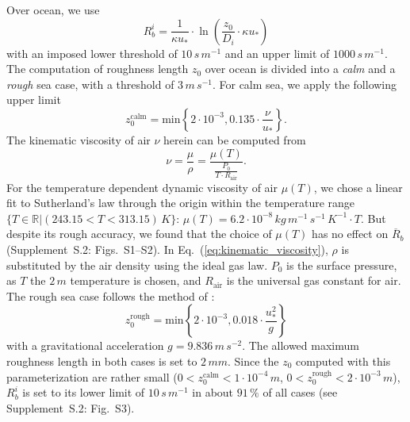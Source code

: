 \documentclass[gmd, manuscript]{copernicus}
\providecommand{\DIFadd}[1]{{\protect\color{blue}\uwave{#1}}} %
\providecommand{\DIFdel}[1]{{\protect\color{red}\sout{#1}}}                      %
\providecommand{\DIFaddbegin}{} %
\providecommand{\DIFaddend}{} %
\providecommand{\DIFdelbegin}{} %
\providecommand{\DIFdelend}{} %
\begin{document}
\DIFaddend %
Over ocean, we use \citep[Eq.~(54),][]{ACP:Simpson2012}
\begin{equation}
  R_b^i = \frac{1}{\kappa u_*}\cdot\ln\left({\frac{z_0}{D_i}\cdot \kappa u_*}\right)
\end{equation}
with an imposed lower threshold of $10\,\unit{s\,m^{-1}}$ and an upper limit of $1000\,\unit{s\,m^{-1}}$. The computation of roughness length $z_0$ over ocean is divided into a \emph{calm} and a \emph{rough} sea case, with a threshold of $3\,\unit{m\,s^{-1}}$. For calm sea, we apply the following upper limit \citep[][with a slightly higher coefficient of $0.135$]{Hinze1975,Garratt1992}
\begin{equation}
  z_0^\text{calm} = \text{min}\left\{2\cdot10^{-3}, 0.135 \cdot \frac{\nu}{u_*}\right\}.
\end{equation}
The kinematic viscosity of air $\nu$ herein can be computed from 
\begin{equation}
  \nu = \frac{\mu}{\rho} = \frac{\mu(T)}{\frac{P_0}{T\cdot R_\text{air}}}.
  \label{eq:kinematic_viscosity}
\end{equation}
For the temperature dependent dynamic viscosity of air $\mu(T)$, we chose a linear fit to Sutherland's law through the origin within the temperature range $\{T \in \mathbb{R} | (243.15 < T < 313.15)\,\unit{K}\}$: $\mu(T) = 6.2\cdot 10^{-8}\,\unit{kg\,m^{-1}\,s^{-1}\,K^{-1}} \cdot T$. But despite its rough accuracy, we found that the choice of $\mu(T)$ has no effect on \DIFdelbegin \DIFdel{$\overline{R}_b$ }\DIFdelend \DIFaddbegin \DIFadd{$\overline{R}_b^{i,k}$ }\DIFaddend (Supplement~S.2: Figs.~S1--S2). In Eq.~(\ref{eq:kinematic_viscosity}), $\rho$ is substituted by the air density using the ideal gas law. $P_0$ is the surface pressure, as $T$ the $2\,\unit{m}$ temperature is chosen, and $R_\text{air}$ is the universal gas constant for air.
The rough sea case follows the method of \citet{QJRMS:Charnock1955,JPO:Wu1980}:
\begin{equation}
  z_0^\text{rough} = \text{min}\left\{2\cdot10^{-3}, 0.018 \cdot \frac{u^2_*}{g}\right\}
\end{equation}
with a gravitational acceleration $g = 9.836\,\unit{m\,s^{-2}}$. The allowed maximum roughness length in both cases is set to $2\,\unit{mm}$. Since the $z_0$ computed with this parameterization are rather small ($0 < z_0^\text{calm} < 1\cdot 10^{-4}\,\unit{m}$, $0 < z_0^\text{rough} < 2 \cdot 10^{-3}\,\unit{m}$), $R^i_b$ is set to its lower limit of $10\,\unit{s\,m^{-1}}$ in about $91\,\unit{\%}$ of all cases (see Supplement~S.2: Fig.~S3). 
\end{document}
